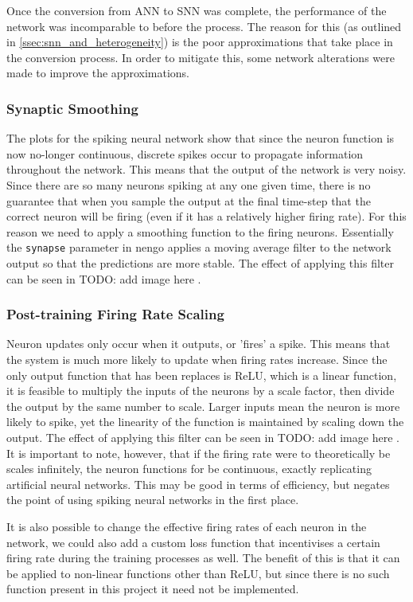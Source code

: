 Once the conversion from ANN to SNN was complete, the performance of the network was incomparable to before the process. The reason for this (as outlined in \cref{ssec:snn_and_heterogeneity}) is the poor approximations that take place in the conversion process. In order to mitigate this, some network alterations were made to improve the approximations.

\subsubsection{Synaptic Smoothing}

The plots for the spiking neural network show that since the neuron function is now no-longer continuous, discrete spikes occur to propagate information throughout the network. This means that the output of the network is very noisy. Since there are so many neurons spiking at any one given time, there is no guarantee that when you sample the output at the final time-step that the correct neuron will be firing (even if it has a relatively higher firing rate). For this reason we need to apply a smoothing function to the firing neurons. Essentially the \lstinline{synapse} parameter in nengo applies a moving average filter to the network output so that the predictions are more stable. The effect of applying this filter can be seen in \color{red} TODO: add image here \color{black}.

\subsubsection{Post-training Firing Rate Scaling}

Neuron updates only occur when it outputs, or 'fires' a spike. This means that the system is much more likely to update when firing rates increase. Since the only output function that has been replaces is ReLU, which is a linear function, it is feasible to multiply the inputs of the neurons by a scale factor, then divide the output by the same number to scale. Larger inputs mean the neuron is more likely to spike, yet the linearity of the function is maintained by scaling down the output. The effect of applying this filter can be seen in \color{red} TODO: add image here \color{black}. It is important to note, however, that if the firing rate were to theoretically be scales infinitely, the neuron functions for be continuous, exactly replicating artificial neural networks. This may be good in terms of efficiency, but negates the point of using spiking neural networks in the first place.

It is also possible to change the effective firing rates of each neuron in the network, we could also add a custom loss function that incentivises a certain firing rate during the training processes as well. The benefit of this is that it can be applied to non-linear functions other than ReLU, but since there is no such function present in this project it need not be implemented.